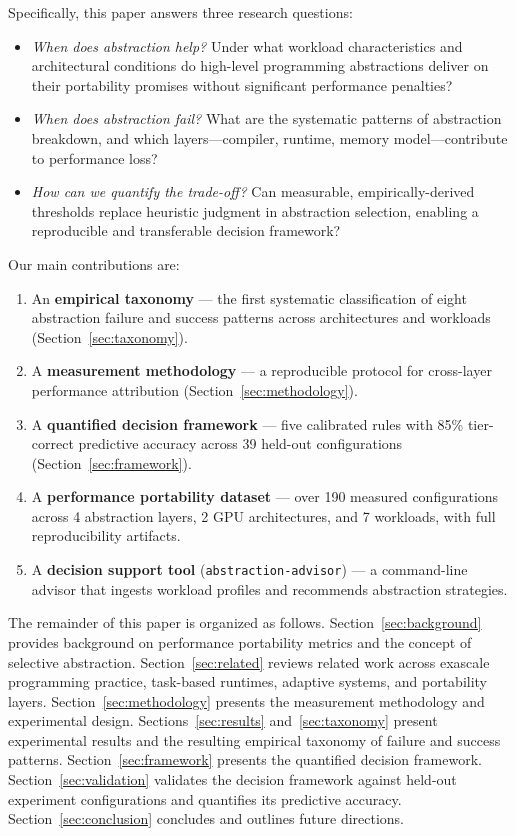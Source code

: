 Specifically, this paper answers three research questions:
\begin{itemize}
    \item[\textbf{RQ1}] \textit{When does abstraction help?} Under what workload
    characteristics and architectural conditions do high-level programming
    abstractions deliver on their portability promises without significant
    performance penalties?

    \item[\textbf{RQ2}] \textit{When does abstraction fail?} What are the
    systematic patterns of abstraction breakdown, and which layers---compiler,
    runtime, memory model---contribute to performance loss?

    \item[\textbf{RQ3}] \textit{How can we quantify the trade-off?} Can
    measurable, empirically-derived thresholds replace heuristic judgment in
    abstraction selection, enabling a reproducible and transferable decision
    framework?
\end{itemize}

Our main contributions are:

\begin{enumerate}
    \item An \textbf{empirical taxonomy} --- the first systematic classification
          of eight abstraction failure and success patterns across architectures
          and workloads (Section~\ref{sec:taxonomy}).
    \item A \textbf{measurement methodology} --- a reproducible protocol for
          cross-layer performance attribution
          (Section~\ref{sec:methodology}).
    \item A \textbf{quantified decision framework} --- five calibrated rules
          with 85\% tier-correct predictive accuracy across 39 held-out
          configurations (Section~\ref{sec:framework}).
    \item A \textbf{performance portability dataset} --- over 190 measured
          configurations across 4 abstraction layers, 2 GPU architectures,
          and 7 workloads, with full reproducibility artifacts.
    \item A \textbf{decision support tool} (\texttt{abstraction-advisor}) --- a
          command-line advisor that ingests workload profiles and recommends
          abstraction strategies.
\end{enumerate}

The remainder of this paper is organized as follows.
Section~\ref{sec:background} provides background on performance portability
metrics and the concept of selective abstraction.
Section~\ref{sec:related} reviews related work across exascale programming
practice, task-based runtimes, adaptive systems, and portability layers.
Section~\ref{sec:methodology} presents the measurement methodology and
experimental design.
Sections~\ref{sec:results} and~\ref{sec:taxonomy} present experimental results
and the resulting empirical taxonomy of failure and success patterns.
Section~\ref{sec:framework} presents the quantified decision framework.
Section~\ref{sec:validation} validates the decision framework against held-out
experiment configurations and quantifies its predictive accuracy.
Section~\ref{sec:conclusion} concludes and outlines future directions.
